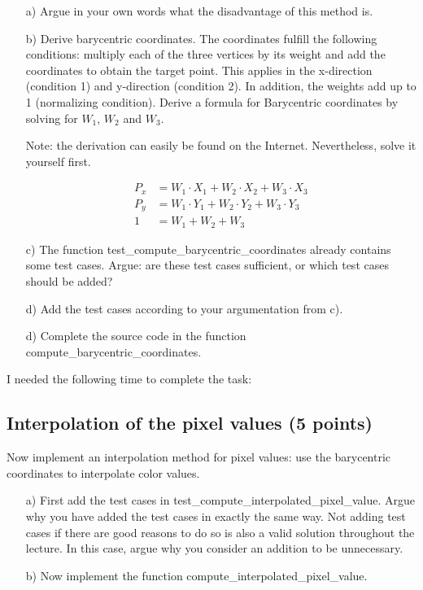 \begin{enumerate}

\item[a)] Argue in your own words what the disadvantage of this method is.

\item[b)] Derive barycentric coordinates. The coordinates fulfill the following conditions: multiply each of the three vertices by its weight and add the coordinates to obtain the target point. This applies in the x-direction (condition 1) and y-direction (condition 2). In addition, the weights add up to 1 (normalizing condition). Derive a formula for
Barycentric coordinates by solving for $W_1$, $W_2$ and $W_3$.

Note: the derivation can easily be found on the Internet. Nevertheless, solve it yourself first.

\begin{align}
	P_x &= W_1 \cdot X_1 + W_2 \cdot X_2 + W_3 \cdot X_3 \\
	P_y &= W_1 \cdot Y_1 + W_2 \cdot Y_2 + W_3 \cdot Y_3 \\
	1 &= W_1 + W_2 + W_3
\end{align}

\item[c)] The function test\_compute\_barycentric\_coordinates already contains some test cases. Argue: are these test cases sufficient, or which test cases should be added? 

\item[d)] Add the test cases according to your argumentation from c). 

\item[d)] Complete the source code in the function compute\_barycentric\_coordinates. 

\end{enumerate}

I needed the following time to complete the task:

\subsection{Interpolation of the pixel values (5 points)}

Now implement an interpolation method for pixel values: use the barycentric coordinates to interpolate color values. 

\begin{enumerate}

\item[a)] First add the test cases in test\_compute\_interpolated\_pixel\_value. Argue why you have added the test cases in exactly the same way. Not adding test cases if there are good reasons to do so is also a valid solution throughout the lecture. In this case, argue why you consider an addition to be unnecessary.

\item[b)] Now implement the function compute\_interpolated\_pixel\_value.

\end{enumerate}

